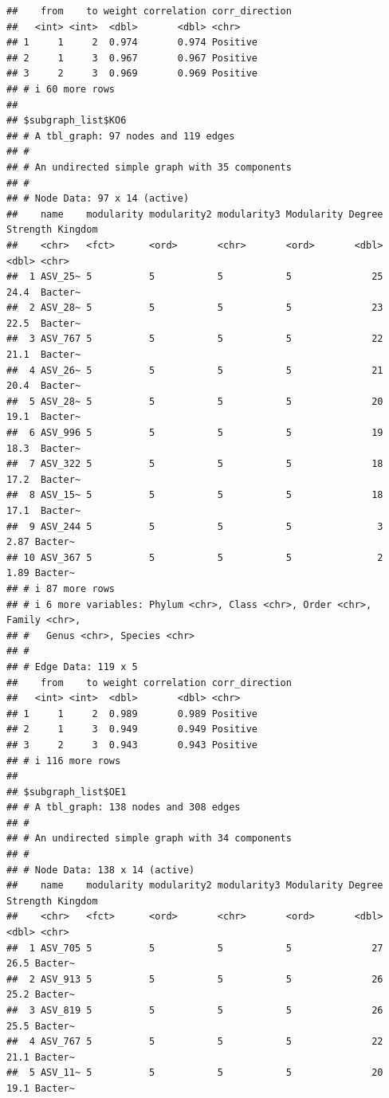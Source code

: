 \documentclass[
]{book}
\begin{document}
\begin{verbatim}
##    from    to weight correlation corr_direction
##   <int> <int>  <dbl>       <dbl> <chr>         
## 1     1     2  0.974       0.974 Positive      
## 2     1     3  0.967       0.967 Positive      
## 3     2     3  0.969       0.969 Positive      
## # i 60 more rows
## 
## $subgraph_list$KO6
## # A tbl_graph: 97 nodes and 119 edges
## #
## # An undirected simple graph with 35 components
## #
## # Node Data: 97 x 14 (active)
##    name    modularity modularity2 modularity3 Modularity Degree Strength Kingdom
##    <chr>   <fct>      <ord>       <chr>       <ord>       <dbl>    <dbl> <chr>  
##  1 ASV_25~ 5          5           5           5              25    24.4  Bacter~
##  2 ASV_28~ 5          5           5           5              23    22.5  Bacter~
##  3 ASV_767 5          5           5           5              22    21.1  Bacter~
##  4 ASV_26~ 5          5           5           5              21    20.4  Bacter~
##  5 ASV_28~ 5          5           5           5              20    19.1  Bacter~
##  6 ASV_996 5          5           5           5              19    18.3  Bacter~
##  7 ASV_322 5          5           5           5              18    17.2  Bacter~
##  8 ASV_15~ 5          5           5           5              18    17.1  Bacter~
##  9 ASV_244 5          5           5           5               3     2.87 Bacter~
## 10 ASV_367 5          5           5           5               2     1.89 Bacter~
## # i 87 more rows
## # i 6 more variables: Phylum <chr>, Class <chr>, Order <chr>, Family <chr>,
## #   Genus <chr>, Species <chr>
## #
## # Edge Data: 119 x 5
##    from    to weight correlation corr_direction
##   <int> <int>  <dbl>       <dbl> <chr>         
## 1     1     2  0.989       0.989 Positive      
## 2     1     3  0.949       0.949 Positive      
## 3     2     3  0.943       0.943 Positive      
## # i 116 more rows
## 
## $subgraph_list$OE1
## # A tbl_graph: 138 nodes and 308 edges
## #
## # An undirected simple graph with 34 components
## #
## # Node Data: 138 x 14 (active)
##    name    modularity modularity2 modularity3 Modularity Degree Strength Kingdom
##    <chr>   <fct>      <ord>       <chr>       <ord>       <dbl>    <dbl> <chr>  
##  1 ASV_705 5          5           5           5              27     26.5 Bacter~
##  2 ASV_913 5          5           5           5              26     25.2 Bacter~
##  3 ASV_819 5          5           5           5              26     25.5 Bacter~
##  4 ASV_767 5          5           5           5              22     21.1 Bacter~
##  5 ASV_11~ 5          5           5           5              20     19.1 Bacter~

\end{verbatim}
\end{document}
